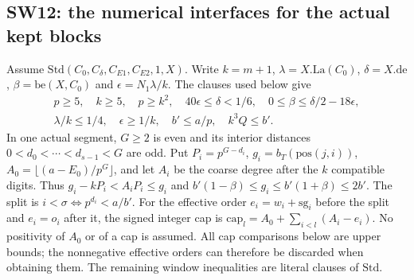 \subsection{SW12: the numerical interfaces for the actual kept blocks}
\label{sec:segment-numerics}


Assume $\mathrm{Std}(C_0,C_\delta,C_{E1},C_{E2},1,X)$.
Write $k=m+1$, $\lambda=X.\mathrm{La}(C_0)$, $\delta=X.\mathrm{de}$,
$\beta=\mathrm{be}(X,C_0)$ and $\epsilon=N_1\lambda/k$.
The clauses used below give
\[
 \begin{gathered}
 p\ge5,\quad k\ge5,\quad p\ge k^2,\quad
 40\epsilon\le\delta<1/6,\quad
 0\le\beta\le\delta/2-18\epsilon,\\
 \lambda/k\le1/4,\quad \epsilon\ge1/k,\quad
 b'\le a/p,\quad k^3Q\le b'.
 \end{gathered}
\]
In one actual segment, $G\ge2$ is even and its interior distances
$0<d_0<\cdots<d_{s-1}<G$ are odd. Put $P_i=p^{G-d_i}$,
$g_i=b_T(\mathrm{pos}(j,i))$, $A_0=\lfloor(a-E_0)/p^G\rfloor$,
and let $A_i$ be the coarse degree after the $k$ compatible digits.
Thus $g_i-kP_i<A_iP_i\le g_i$ and
$b'(1-\beta)\le g_i\le b'(1+\beta)\le2b'$.
The split is $i<\sigma\iff p^{d_i}<a/b'$.
For the effective order $e_i=w_i+\mathrm{sg}_i$ before the split and
$e_i=o_i$ after it, the signed integer cap is
$\mathrm{cap}_l=A_0+\sum_{i<l}(A_i-e_i)$.
No positivity of $A_0$ or of a cap is assumed. All cap comparisons below
are upper bounds; the nonnegative effective orders can therefore be
discarded when obtaining them. The remaining window inequalities are
literal clauses of $\mathrm{Std}$.

